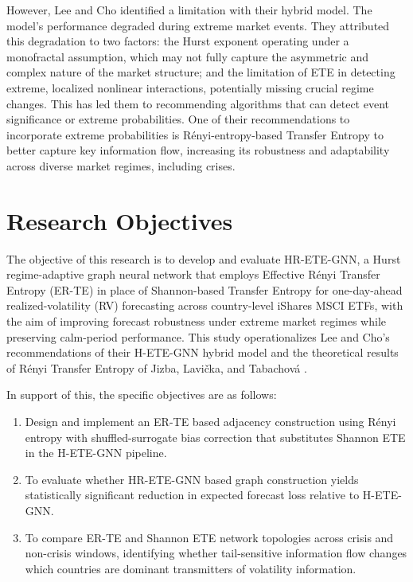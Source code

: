 \documentclass[12pt,oneside]{report}
\begin{document}
However, Lee and Cho \cite{lee2025} identified a limitation with their
hybrid model. The model's performance degraded during extreme market
events. They attributed this degradation to two factors: the Hurst
exponent operating under a monofractal assumption, which may not fully
capture the asymmetric and complex nature of the market structure; and
the limitation of ETE in detecting extreme, localized nonlinear
interactions, potentially missing crucial regime changes. This has led
them to recommending algorithms that can detect event significance or
extreme probabilities. One of their recommendations to incorporate
extreme probabilities is Rényi-entropy-based Transfer Entropy to better
capture key information flow, increasing its robustness and adaptability
across diverse market regimes, including crises.

\section{Research Objectives}

The objective of this research is to develop and evaluate HR-ETE-GNN, a
Hurst regime-adaptive graph neural network that employs Effective Rényi
Transfer Entropy (ER-TE) in place of Shannon-based Transfer Entropy for
one-day-ahead realized-volatility (RV) forecasting across country-level
iShares MSCI ETFs, with the aim of improving forecast robustness under
extreme market regimes while preserving calm-period performance. This
study operationalizes Lee and Cho's \cite{lee2025} recommendations of
their H-ETE-GNN hybrid model and the theoretical results of Rényi
Transfer Entropy of Jizba, Lavička, and Tabachová \cite{jizba2022}.

In support of this, the specific objectives are as follows:

\begin{enumerate}
  \item Design and implement an ER-TE based adjacency construction using
        Rényi entropy with shuffled-surrogate bias correction that
        substitutes Shannon ETE in the H-ETE-GNN pipeline.
  \item To evaluate whether HR-ETE-GNN based graph construction yields
        statistically significant reduction in expected forecast loss
        relative to H-ETE-GNN.
  \item To compare ER-TE and Shannon ETE network topologies across crisis
        and non-crisis windows, identifying whether tail-sensitive
        information flow changes which countries are dominant
        transmitters of volatility information.
\end{enumerate}
\end{document}
